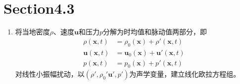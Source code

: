 \section*{Section4.3}

\begin{enumerate}
    \item 将当地密度\( \rho \)、速度\(\boldsymbol{u}\)和压力\(p\)分解为时均值和脉动值两部分，即
    \begin{align*}
        \rho (\boldsymbol{x},t) &= \rho_{0} (\boldsymbol{x}) + \rho \prime (\boldsymbol{x},t) \\
        \boldsymbol{u} (\boldsymbol{x},t) &= \boldsymbol{u}_{0} (\boldsymbol{x}) + \boldsymbol{u} \prime (\boldsymbol{x},t) \\
        p (\boldsymbol{x},t) &= p_{0} (\boldsymbol{x}) + p \prime (\boldsymbol{x},t)
    \end{align*}
    对线性小振幅扰动，以\((\rho \prime , \rho_{0} \prime \boldsymbol{u} \prime, p \prime)\)为声学变量，建立线化欧拉方程组。


\end{enumerate}
